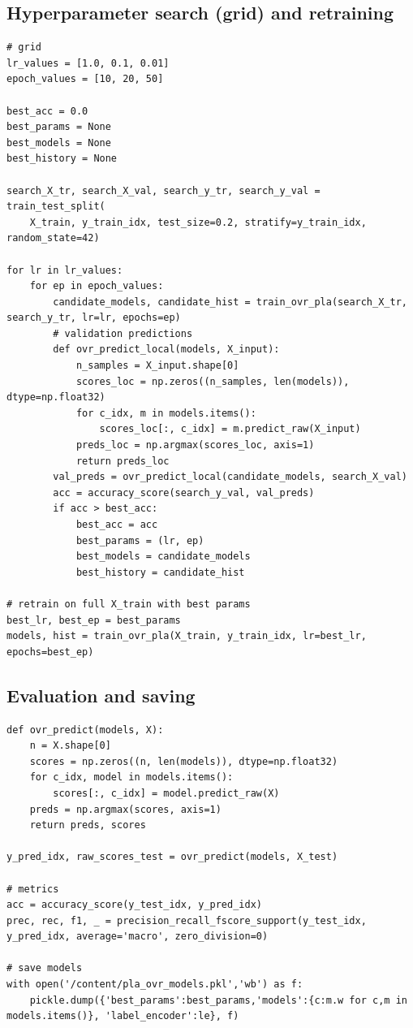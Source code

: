 \documentclass[11pt,a4paper]{article}
\begin{document}
\subsection{Hyperparameter search (grid) and retraining}
\begin{lstlisting}[caption={Grid search over LR and epochs; retrain best on full train}]
# grid
lr_values = [1.0, 0.1, 0.01]
epoch_values = [10, 20, 50]

best_acc = 0.0
best_params = None
best_models = None
best_history = None

search_X_tr, search_X_val, search_y_tr, search_y_val = train_test_split(
    X_train, y_train_idx, test_size=0.2, stratify=y_train_idx, random_state=42)

for lr in lr_values:
    for ep in epoch_values:
        candidate_models, candidate_hist = train_ovr_pla(search_X_tr, search_y_tr, lr=lr, epochs=ep)
        # validation predictions
        def ovr_predict_local(models, X_input):
            n_samples = X_input.shape[0]
            scores_loc = np.zeros((n_samples, len(models)), dtype=np.float32)
            for c_idx, m in models.items():
                scores_loc[:, c_idx] = m.predict_raw(X_input)
            preds_loc = np.argmax(scores_loc, axis=1)
            return preds_loc
        val_preds = ovr_predict_local(candidate_models, search_X_val)
        acc = accuracy_score(search_y_val, val_preds)
        if acc > best_acc:
            best_acc = acc
            best_params = (lr, ep)
            best_models = candidate_models
            best_history = candidate_hist

# retrain on full X_train with best params
best_lr, best_ep = best_params
models, hist = train_ovr_pla(X_train, y_train_idx, lr=best_lr, epochs=best_ep)
\end{lstlisting}

\subsection{Evaluation and saving}
\begin{lstlisting}[caption={Prediction, metrics, plots, save weights}]
def ovr_predict(models, X):
    n = X.shape[0]
    scores = np.zeros((n, len(models)), dtype=np.float32)
    for c_idx, model in models.items():
        scores[:, c_idx] = model.predict_raw(X)
    preds = np.argmax(scores, axis=1)
    return preds, scores

y_pred_idx, raw_scores_test = ovr_predict(models, X_test)

# metrics
acc = accuracy_score(y_test_idx, y_pred_idx)
prec, rec, f1, _ = precision_recall_fscore_support(y_test_idx, y_pred_idx, average='macro', zero_division=0)

# save models
with open('/content/pla_ovr_models.pkl','wb') as f:
    pickle.dump({'best_params':best_params,'models':{c:m.w for c,m in models.items()}, 'label_encoder':le}, f)
\end{lstlisting}
\end{document}
